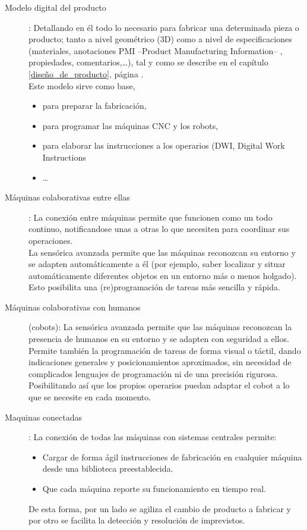 \documentclass[spanish,12pt,a4paper,final,oneside]{book}
\begin{document}
\begin{description}
\item[Modelo digital del producto]: Detallando en él todo lo necesario para fabricar una determinada pieza o producto; tanto a nivel geométrico (3D) como a nivel de especificaciones (materiales, anotaciones PMI --Product Manufacturing Information-- , propiedades, comentarios,\ldots), tal y como se describe en el capítulo \ref{diseño_de_producto}, página \pageref{diseño_de_producto}.
\\Este modelo sirve como base, 
\begin{itemize}
\item para preparar la fabricación, 
\item para programar las máquinas CNC y los robots,
\item para elaborar las instrucciones a los operarios (DWI, Digital Work Instructions
\item \ldots
\end{itemize}

\item[Máquinas colaborativas entre ellas]: La conexión entre máquinas permite que funcionen como un todo continuo, notificandose unas a otras lo que necesiten para coordinar sus operaciones.
\\La sensórica avanzada permite que las máquinas reconozcan su entorno y se adapten automáticamente a él (por ejemplo, saber localizar y situar automáticamente diferentes objetos en un entorno más o menos holgado).
\\Esto posibilita una (re)programación de tareas más sencilla y rápida. 

\item[Máquinas colaborativas con humanos] (cobots): La sensórica avanzada permite que las máquinas reconozcan la presencia de humanos en su entorno y se adapten con seguridad a ellos.
\\Permite también la programación de tareas de forma visual o táctil, dando indicaciones generales y posicionamientos aproximados, sin necesidad de complicados lenguajes de programación ni de una precisión rigurosa. 
\\Posibilitando así que los propios operarios puedan adaptar el cobot a lo que se necesite en cada momento.

\item[Maquinas conectadas]: La conexión de todas las máquinas con sistemas centrales permite:
\begin{itemize}
\item Cargar de forma ágil instrucciones de fabricación en cualquier máquina desde una biblioteca preestablecida.
\item Que cada máquina reporte su funcionamiento en tiempo real.
\end{itemize}
De esta forma, por un lado se agiliza el cambio de producto a fabricar y por otro se facilita la detección y resolución de imprevistos.


\end{description}
\end{document}
